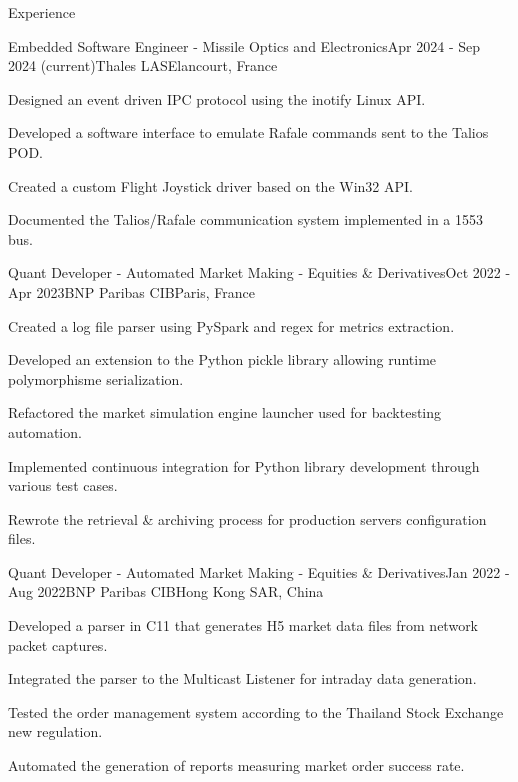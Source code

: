 \documentclass[
	a4paper, %
	10pt, %
]{resume} %
\def\CC{{C\nolinebreak[4]\hspace{-.05em}\raisebox{.4ex}{\tiny\bf ++}}}
\begin{document}
\begin{rSection}{Experience}

	\begin{rSubsection}{Embedded Software Engineer - Missile Optics and Electronics}{Apr 2024 - Sep 2024 (current)}{Thales LAS}{Elancourt, France}
    \item Designed an event driven IPC protocol using the inotify Linux API.
    \item Developed a software interface to emulate Rafale commands sent to the Talios POD.
    \item Created a custom Flight Joystick driver based on the Win32 API.
    \item Documented the Talios/Rafale communication system implemented in a 1553 bus.
	\end{rSubsection}

	\begin{rSubsection}{Quant Developer - Automated Market Making - Equities \& Derivatives}{Oct 2022 - Apr 2023}{BNP Paribas CIB}{Paris, France}
		\item Created a log file parser using PySpark and regex for metrics extraction.
		\item Developed an extension to the Python pickle library allowing runtime polymorphisme serialization.
		\item Refactored the market simulation engine launcher used for backtesting automation.
		\item Implemented continuous integration for Python library development through various test cases.
		\item Rewrote the retrieval \& archiving process for production servers configuration files.
	\end{rSubsection}

	\begin{rSubsection}{Quant Developer - Automated Market Making - Equities \& Derivatives}{Jan 2022 - Aug 2022}{BNP Paribas CIB}{Hong Kong SAR, China}
    \item Developed a parser in \CC11 that generates H5 market data files from network packet captures.
		\item Integrated the parser to the Multicast Listener for intraday data generation.
		\item Tested the order management system according to the Thailand Stock Exchange new regulation.
		\item Automated the generation of reports measuring market order success rate.
	\end{rSubsection}

\end{rSection}
\end{document}
